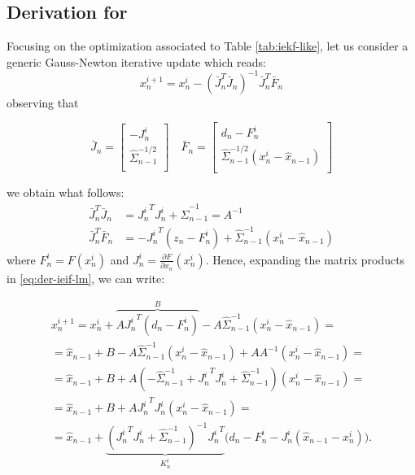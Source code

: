 \subsection{Derivation for }
\label{app:ieif-lm}
%
Focusing on the optimization associated to Table \ref{tab:iekf-like}, let us consider a generic Gauss-Newton iterative update which reads:
% 
\begin{equation}
\label{eq:der-ieif-lm}
    x_n^{i + 1}= x_n^{i} - (\bar{J}_n^T \bar{J}_n)^{-1} \bar{J}_n^T \bar{F}_n 
\end{equation}
observing that
\begin{small}
\begin{equation}
\bar{J}_n = \left[
 \begin{array}{c}
 	- J_n^i \\
\hat{\Sigma}_{n-1}^{-1/2} \\
 \end{array}
 \right]
\quad
\bar{F}_n = \left[
 \begin{array}{c}
 d_n - F_n^i \\
\hat{\Sigma}_{n-1}^{-1/2} (x_n^i - \hat{x}_{n - 1}) \\
 \end{array}
 \right]   
\end{equation}
\end{small}
we obtain what follows:
\begin{align*}
\bar{J}_n^T \bar{J}_n &= {J_n^i}^T J_n^i +\hat{\Sigma}_{n-1}^{-1} = A^{-1} \\
\bar{J}_n^T \bar{F}_n  &=  	- {J_n^i}^T(z_n - F_n^i) + \hat{\Sigma}_{n-1}^{-1}(x_n^i - \hat{x}_{n - 1})
 \end{align*}
where  $F_n^i = F(x_n^i)$ and $J_n^i = \frac{\partial F}{\partial x_n}(x_n^i)$.
Hence, expanding the matrix products in \eqref{eq:der-ieif-lm}, we can write:
\begin{small}
\begin{align*}
x_n^{i + 1} 
= x_n^i +\overbrace{A {J_n^i}^T(d_n - F_n^i)}^B - A \hat{\Sigma}_{n-1}^{-1}(x_n^i - \hat{x}_{n - 1})  = \\
= \hat{x}_{n - 1} + B  - A \hat{\Sigma}_{n-1}^{-1}(x_n^i - \hat{x}_{n - 1}) + A A^{-1}( x_n^i - \hat{x}_{n - 1}) = \\
= \hat{x}_{n - 1} + B + A(- \hat{\Sigma}_{n-1}^{-1} + {J_n^i}^T J_n^i + \hat{\Sigma}_{n-1}^{-1})(x_n^i - \hat{x}_{n - 1}) = \\
= \hat{x}_{n - 1} + B + A {J_n^i}^T J_n^i (x_n^i - \hat{x}_{n - 1}) = \\
= \hat{x}_{n - 1} + \underbrace{\left({J_n^i}^T J_n^i + \hat{\Sigma}_{n-1}^{-1}\right)^{-1} {J_n^i}^T}_{K_n^i}  \big(d_n - F_n^i - J_n^i (\hat{x}_{n - 1} - x_n^i)\big).
\end{align*}
\end{small}
